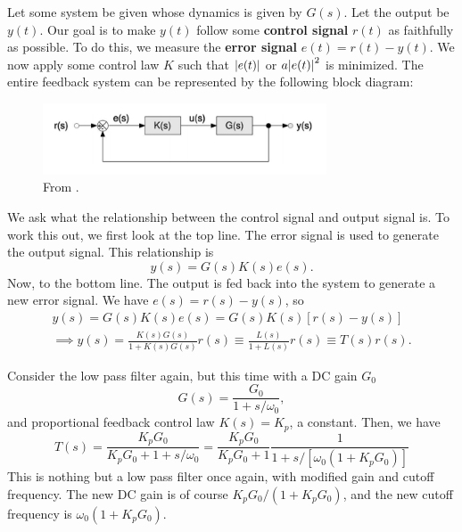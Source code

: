 \documentclass{book}
\theoremstyle{definition}
\newcommand{\f}[2]{\frac{#1}{#2}}
\begin{document}
Let some system be given whose dynamics is given by $G(s)$. Let the output be $y(t)$. Our goal is to make $y(t)$ follow some \textbf{control signal} $r(t)$ as faithfully as possible. To do this, we measure the \textbf{error signal} $e(t) = r(t) - y(t)$. We now apply some control law $K$ such that $\abs{e(t)}$ or $a\abs{e(t)}^2$ is minimized. The entire feedback system can be represented by the following block diagram:

\begin{figure}[!htb]
	\centering
	\includegraphics[width=0.75\textwidth]{images/block-2}
	\caption{From \cite{bechhoefer2005feedback}.}
\end{figure}

We ask what the relationship between the control signal and output signal is. To work this out, we first look at the top line. The error signal is used to generate the output signal. This relationship is 
\begin{equation*}
y(s) = G(s)K(s) e(s). 
\end{equation*}
Now, to the bottom line. The output is fed back into the system to generate a new error signal. We have $e(s) = r(s) - y(s)$, so 
\begin{align*}
y(s) = G(s)K(s) e(s) = G(s)K(s) [r(s) - y(s)] \\\implies y(s) = \f{K(s)G(s)}{1 + K(s)G(s)}r(s) \equiv \f{L(s)}{1 + L(s)}r(s) \equiv T(s) r(s). 
\end{align*}

Consider the low pass filter again, but this time with a DC gain $G_0$
\begin{equation*}
G(s) = \f{G_0}{1+ s/\omega_0},
\end{equation*}
and proportional feedback control law $K(s) = K_p$, a constant. Then, we have
\begin{equation*}
T(s) = \f{K_p G_0}{K_p G_0 + 1 + s/\omega_0} = \f{K_p G_0}{K_p G_0 +1} \f{1}{1 + s/[\omega_0(1 + K_p G_0)]}
\end{equation*}
This is nothing but a low pass filter once again, with modified gain and cutoff frequency. The new DC gain is of course $K_p G_0 / (1 + K_p G_0)$, and the new cutoff frequency is $\omega_0(1 + K_p G_0)$. \\
\end{document}
